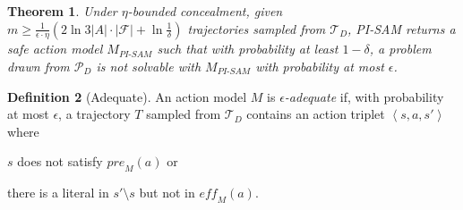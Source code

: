 \documentclass{article}
\theoremstyle{plain}
\newtheorem{theorem}{Theorem}[section]
\theoremstyle{definition}
\newtheorem{definition}[theorem]{Definition}
\theoremstyle{remark}
\theoremstyle{observation}
\newcommand{\tuple}[1]{\ensuremath{\left \langle #1 \right \rangle }}
\newcommand{\pre}{\textit{pre}}
\newcommand{\eff}{\textit{eff}}
\newcommand{\pisam}{\textit{PI-SAM}\xspace}
\begin{document}
\begin{theorem}\label{complexity-pisam-thm}
Under $\eta$-bounded concealment, given 
$m \geq \frac{1}{\epsilon \cdot\eta} (2\ln 3 |A|\cdot {|\mathcal{F}|} + \ln \frac{1}{\delta})$
trajectories sampled from $\mathcal{T}_D$, 
PI-SAM returns a safe action model $M_\pisam$ such that with probability at least $1-\delta$, a problem drawn from $\mathcal{P}_D$ is not solvable with $M_\pisam$ with probability at most $\epsilon$.
\end{theorem}

\begin{definition}[Adequate]
An action model $M$ is {\em $\epsilon$-adequate} if, with probability at most $\epsilon$, a trajectory $T$ sampled from $\mathcal{T}_D$ contains an action triplet $\tuple{s,a,s'}$ where
\begin{inparaenum}
\item $s$ does not satisfy $\pre_M(a)$ or
\item there is a literal in $s'\setminus s$ but not in $\eff_M(a)$.
\end{inparaenum}
\end{definition}
\end{document}
